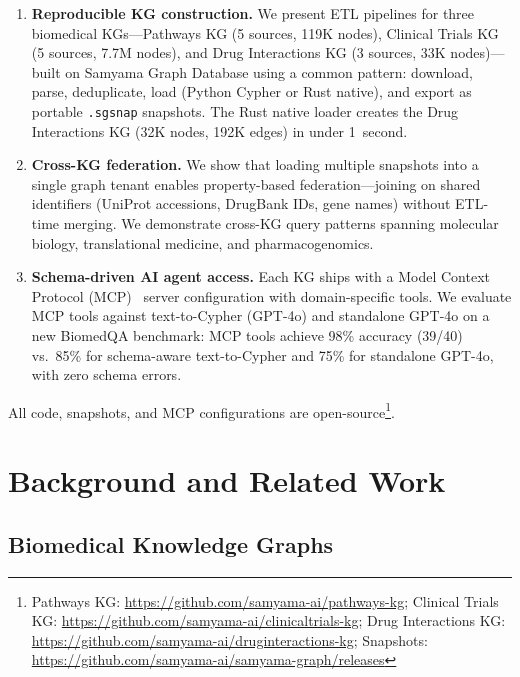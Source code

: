 \documentclass[11pt]{article}
\begin{document}
\begin{enumerate}[leftmargin=*]
  \item \textbf{Reproducible KG construction.} We present ETL pipelines for three biomedical KGs---Pathways KG (5 sources, 119K nodes), Clinical Trials KG (5 sources, 7.7M nodes), and Drug Interactions KG (3 sources, 33K nodes)---built on Samyama Graph Database using a common pattern: download, parse, deduplicate, load (Python Cypher or Rust native), and export as portable \texttt{.sgsnap} snapshots. The Rust native loader creates the Drug Interactions KG (32K nodes, 192K edges) in under 1~second.

  \item \textbf{Cross-KG federation.} We show that loading multiple snapshots into a single graph tenant enables property-based federation---joining on shared identifiers (UniProt accessions, DrugBank IDs, gene names) without ETL-time merging. We demonstrate cross-KG query patterns spanning molecular biology, translational medicine, and pharmacogenomics.

  \item \textbf{Schema-driven AI agent access.} Each KG ships with a Model Context Protocol (MCP)~\citep{anthropic2024mcp} server configuration with domain-specific tools. We evaluate MCP tools against text-to-Cypher (GPT-4o) and standalone GPT-4o on a new BiomedQA benchmark: MCP tools achieve 98\% accuracy (39/40) vs.\ 85\% for schema-aware text-to-Cypher and 75\% for standalone GPT-4o, with zero schema errors.
\end{enumerate}

All code, snapshots, and MCP configurations are open-source\footnote{Pathways KG: \url{https://github.com/samyama-ai/pathways-kg}; Clinical Trials KG: \url{https://github.com/samyama-ai/clinicaltrials-kg}; Drug Interactions KG: \url{https://github.com/samyama-ai/druginteractions-kg}; Snapshots: \url{https://github.com/samyama-ai/samyama-graph/releases}}.

\section{Background and Related Work}

\subsection{Biomedical Knowledge Graphs}
\end{document}

